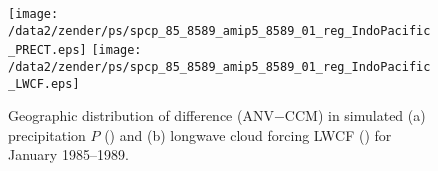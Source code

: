 \documentclass[twocolumn,final]{article}
\begin{document}
\setlength\abovecaptionskip{9pt}
\setlength\belowcaptionskip{9pt}

\setlength\floatsep{0pt}
\setlength\textfloatsep{0pt}
\setlength\dblfloatsep{0pt}
\setlength\dbltextfloatsep{0pt}
\setlength\intextsep{0pt}

\setcounter{page}{1}
\pagestyle{myheadings}
\thispagestyle{empty}
\onecolumn
\listoffigures
\twocolumn
{}
\setcounter{page}{1}

\begin{figure}
\begin{center}
\texttt{[image: /data2/zender/ps/spcp\_85\_8589\_amip5\_8589\_01\_reg\_IndoPacific\_PRECT.eps]}\vfill
\texttt{[image: /data2/zender/ps/spcp\_85\_8589\_amip5\_8589\_01\_reg\_IndoPacific\_LWCF.eps]}\vfill
\end{center}
\caption[Geographic distribution of difference (ANV$-$CCM) in
simulated precipitation $P$ and longwave cloud forcing LWCF between
ANV and CCM over the Indo-Pacific for January 1985--1989]{ 
Geographic distribution of difference (ANV$-$CCM) in simulated
(a) precipitation $P$ (\mmxday) and (b) longwave cloud forcing LWCF
(\wxmS) for January 1985--1989.
\label{fig:8589_01_reg_IndoPacific}}
\end{figure}
\clearpage
\end{document}
